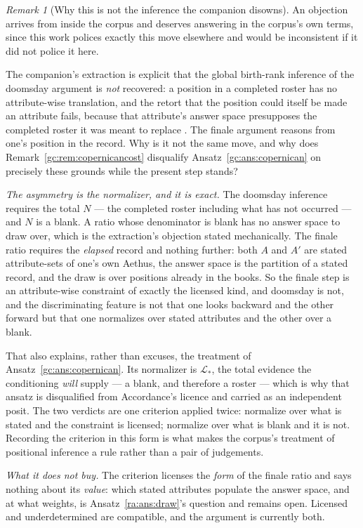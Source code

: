 \documentclass[11pt]{article}
\numberwithin{equation}{section}
\theoremstyle{plain}
\theoremstyle{definition}
\theoremstyle{remark}
\newtheorem{remark}[theorem]{Remark}
\newcommand{\Lc}{\mathcal{L}}
\begin{document}
\begin{remark}[Why this is not the inference the companion disowns]
\label{ra:rem:noroster}
An objection arrives from inside the corpus and deserves answering in
the corpus's own terms, since this work polices exactly this move
elsewhere and would be inconsistent if it did not police it here.

The companion's extraction is explicit that the global birth-rank
inference of the doomsday argument is \emph{not} recovered: a position
in a completed roster has no attribute-wise translation, and the retort
that the position could itself be made an attribute fails, because that
attribute's answer space presupposes the completed roster it was meant
to replace \cite{NexicFoundation}. The finale argument reasons from
one's position in the record. Why is it not the same move, and why does
Remark~\ref{gc:rem:copernicancost} disqualify
Ansatz~\ref{gc:ans:copernican} on precisely these grounds while the
present step stands?

\emph{The asymmetry is the normalizer, and it is exact.} The doomsday
inference requires the total $N$ --- the completed roster including
what has not occurred --- and $N$ is a blank. A ratio whose denominator
is blank has no answer space to draw over, which is the extraction's
objection stated mechanically. The finale ratio requires the
\emph{elapsed} record and nothing further: both $A$ and $A'$ are
stated attribute-sets of one's own Aethus, the answer space is the
partition of a stated record, and the draw is over positions already
in the books. So the finale step is an attribute-wise constraint of
exactly the licensed kind, and doomsday is not, and the discriminating
feature is not that one looks backward and the other forward but that
one normalizes over stated attributes and the other over a blank.

That also explains, rather than excuses, the treatment of
Ansatz~\ref{gc:ans:copernican}. Its normalizer is $\Lc_\ast$, the total
evidence the conditioning \emph{will} supply --- a blank, and therefore
a roster --- which is why that ansatz is disqualified from Accordance's
licence and carried as an independent posit. The two verdicts are one
criterion applied twice: normalize over what is stated and the
constraint is licensed; normalize over what is blank and it is not.
Recording the criterion in this form is what makes the corpus's
treatment of positional inference a rule rather than a pair of
judgements.

\emph{What it does not buy.} The criterion licenses the \emph{form} of
the finale ratio and says nothing about its \emph{value}: which stated
attributes populate the answer space, and at what weights, is
Ansatz~\ref{ra:ans:draw}'s question and remains open. Licensed and
underdetermined are compatible, and the argument is currently both.
\end{remark}
\end{document}
